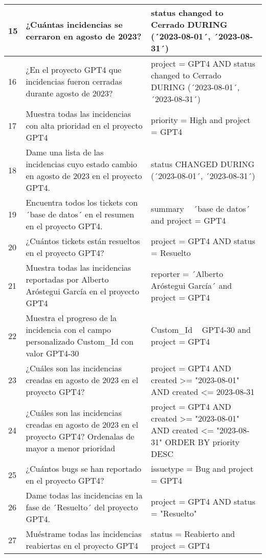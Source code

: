 \begin{center}
\begin{longtable}{ | p{1cm} | p{8cm} | p{6cm} | }
        \hline
        15 & ¿Cuántas incidencias se cerraron en agosto de 2023? & status changed to Cerrado DURING (´2023-08-01´, ´2023-08-31´) \\
        \hline
        16 & ¿En el proyecto GPT4 que incidencias fueron cerradas durante agosto de 2023? & project = GPT4 AND status changed to Cerrado DURING (´2023-08-01´, ´2023-08-31´) \\
        \hline
        17 & Muestra todas las incidencias con alta prioridad en el proyecto GPT4 & priority = High and project = GPT4 \\
        \hline
        18 & Dame una lista de las incidencias cuyo estado cambio en agosto de 2023 en el proyecto GPT4. & status CHANGED DURING (´2023-08-01´, ´2023-08-31´) \\
        \hline
        19 & Encuentra todos los tickets con ´base de datos´ en el resumen en el proyecto GPT4. & summary ~ ´base de datos´ and project = GPT4 \\
        \hline
        20 & ¿Cuántos tickets están resueltos en el proyecto GPT4? & project = GPT4 AND status = Resuelto \\
        \hline
        21 & Muestra todas las incidencias reportadas por Alberto Aróstegui García en el proyecto GPT4 & reporter = ´Alberto Aróstegui García´ and project = GPT4 \\
        \hline
        22 & Muestra el progreso de la incidencia con el campo personalizado Custom\_Id con valor GPT4-30 & Custom\_Id ~ GPT4-30 and project = GPT4 \\
        \hline
        23 & ¿Cuáles son las incidencias creadas en agosto de 2023 en el proyecto GPT4? & project = GPT4 AND created >= "2023-08-01" AND created <= 2023-08-31 \\
        \hline
        24 & ¿Cuáles son las incidencias creadas en agosto de 2023 en el proyecto GPT4? Ordenalas de mayor a menor prioridad & project = GPT4 AND created >= "2023-08-01" AND created <= "2023-08-31" ORDER BY priority DESC \\
        \hline
        25 & ¿Cuántos bugs se han reportado en el proyecto GPT4? & issuetype = Bug and project = GPT4 \\
        \hline
        26 & Dame todas las incidencias en la fase de ´Resuelto´ del proyecto GPT4. & project = GPT4 AND status = "Resuelto" \\
        \hline
        27 & Muéstrame todas las incidencias reabiertas en el proyecto GPT4 & status = Reabierto and project = GPT4 \\

\end{longtable}
\end{center}
